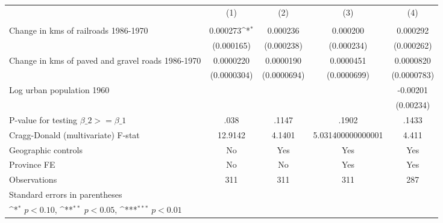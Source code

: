 {
\def\sym#1{\ifmmode^{#1}\else\(^{#1}\)\fi}
\begin{tabular}{l*{4}{c}}
\hline\hline
                &\multicolumn{1}{c}{(1)}&\multicolumn{1}{c}{(2)}&\multicolumn{1}{c}{(3)}&\multicolumn{1}{c}{(4)}\\
                &\multicolumn{1}{c}{}&\multicolumn{1}{c}{}&\multicolumn{1}{c}{}&\multicolumn{1}{c}{}\\
\hline
Change in kms of railroads 1986-1970& 0.000273\sym{*}  & 0.000236         & 0.000200         & 0.000292         \\
                &(0.000165)         &(0.000238)         &(0.000234)         &(0.000262)         \\
[1em]
Change in kms of paved and gravel roads 1986-1970&0.0000220         &0.0000190         &0.0000451         &0.0000820         \\
                &(0.0000304)         &(0.0000694)         &(0.0000699)         &(0.0000783)         \\
[1em]
Log urban population 1960&                  &                  &                  & -0.00201         \\
                &                  &                  &                  &(0.00234)         \\
\hline
P-value for testing $\beta\_{2} >= \beta\_{1}$&     .038         &    .1147         &    .1902         &    .1433         \\
Cragg-Donald (multivariate) F-stat&  12.9142         &   4.1401         &5.031400000000001         &    4.411         \\
Geographic controls&       No         &      Yes         &      Yes         &      Yes         \\
Province FE     &       No         &       No         &      Yes         &      Yes         \\
Observations    &      311         &      311         &      311         &      287         \\
\hline\hline
\multicolumn{5}{l}{\footnotesize Standard errors in parentheses}\\
\multicolumn{5}{l}{\footnotesize \sym{*} \(p<0.10\), \sym{**} \(p<0.05\), \sym{***} \(p<0.01\)}\\
\end{tabular}
}
